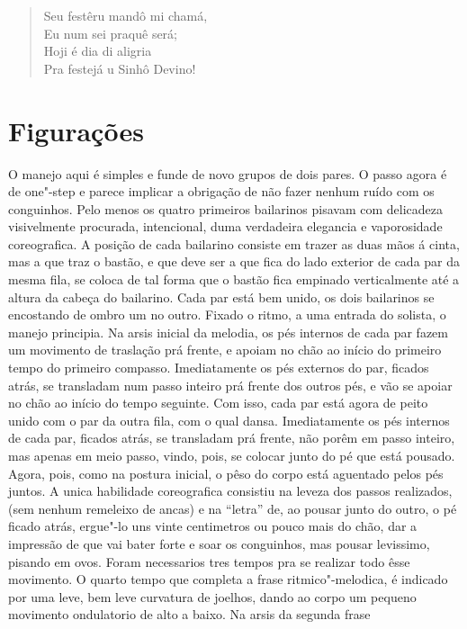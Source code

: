\begin{verse}
Seu festêru mandô mi chamá,\\
Eu num sei praquê será;\\
Hoji é dia di aligria\\
Pra festejá u Sinhô Devino!
\end{verse}

\section*{Figurações}

O manejo aqui é simples e funde de novo grupos de dois pares. O passo
agora é de one"-step e parece implicar a obrigação de não fazer nenhum
ruído com os conguinhos. Pelo menos os quatro primeiros bailarinos
pisavam com delicadeza visivelmente procurada, intencional, duma
verdadeira elegancia e vaporosidade coreografica. A posição de cada
bailarino consiste em trazer as duas mãos á cinta, mas a que traz o
bastão, e que deve ser a que fica do lado exterior de cada par da mesma
fila, se coloca de tal forma que o bastão fica empinado verticalmente
até a altura da cabeça do bailarino. Cada par está bem unido, os dois
bailarinos se encostando de ombro um no outro. Fixado o ritmo, a uma
entrada do solista, o manejo principia. Na arsis inicial da melodia, os
pés internos de cada par fazem um movimento de traslação prá frente, e
apoiam no chão ao início do primeiro tempo do primeiro compasso.
Imediatamente os pés externos do par, ficados atrás, se transladam num
passo inteiro prá frente dos outros pés, e vão se apoiar no chão ao
início do tempo seguinte. Com isso, cada par está agora de peito unido
com o par da outra fila, com o qual dansa. Imediatamente os pés internos
de cada par, ficados atrás, se transladam prá frente, não porêm em passo
inteiro, mas apenas em meio passo, vindo, pois, se colocar junto do pé
que está pousado. Agora, pois, como na postura inicial, o pêso do corpo
está aguentado pelos pés juntos. A unica habilidade coreografica
consistiu na leveza dos passos realizados, (sem nenhum remeleixo de
ancas) e na ``letra'' de, ao pousar junto do outro, o pé ficado atrás,
ergue"-lo uns vinte centimetros ou pouco mais do chão, dar a impressão de
que vai bater forte e soar os conguinhos, mas pousar levissimo, pisando
em ovos. Foram necessarios tres tempos pra se realizar todo êsse
movimento. O quarto tempo que completa a frase ritmico"-melodica, é
indicado por uma leve, bem leve curvatura de joelhos, dando ao corpo um
pequeno movimento ondulatorio de alto a baixo. Na arsis da segunda frase

